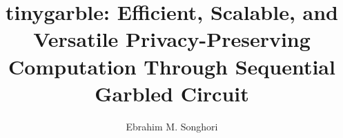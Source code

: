 \documentclass[12pt]{ruthesis}
\title{\gls{tinygarble}: Efficient, Scalable, and Versatile Privacy-Preserving Computation Through Sequential Garbled Circuit}
\author{Ebrahim M. Songhori}
\begin{document}
  \begin{frontmatter}
   \maketitle
   
   
   \tableofcontents
   \listoffigures
   \listoftables
   
  \end{frontmatter}











\appendices





\pagebreak
\printglossary



\end{document}
